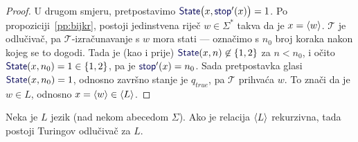 \begin{proof}
U drugom smjeru, pretpostavimo $\f{State}\bigl(x,\f{stop}'(x)\bigr)=1$. Po propoziciji~\ref{pp:bijkr}, postoji jedinstvena riječ $w\in\Sigma^*$ takva da je $x=\langle w\rangle$. $\mathcal T$ je odlučivač, pa $\mathcal T$-izračunavanje s $w$ mora stati --- označimo s $n_0$ broj koraka nakon kojeg se to dogodi. Tada je (kao i prije) $\f{State}(x,n)\not\in\{1,2\}$ za $n<n_0$, i očito $\f{State}(x,n_0)=1\in\{1,2\}$, pa je $\f{stop}'(x)=n_0$. Sada pretpostavka glasi $\f{State}(x,n_0)=1$, odnosno završno stanje je $q_{\mathit{true}}$, pa $\mathcal T$ prihvaća $w$. To znači da je $w\in L$, odnosno $x=\langle w\rangle\in\langle L\rangle$.
\end{proof}

\begin{teorem}\label{tm:krio}
Neka je $L$ jezik (nad nekom abecedom $\Sigma$). Ako je relacija $\langle L\rangle$ rekurzivna, tada postoji Turingov odlučivač za $L$.
\end{teorem}
